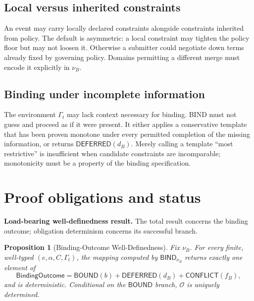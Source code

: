 \documentclass[11pt,openany]{book}
\newtheorem{proposition}[definition]{Proposition}
\newcommand{\Bind}{\mathsf{BIND}}
\begin{document}
\subsection{Local versus inherited constraints}

An event may carry locally declared constraints alongside constraints inherited
from policy. The default is asymmetric: a local constraint may tighten the
policy floor but may not loosen it. Otherwise a submitter could negotiate down
terms already fixed by governing policy. Domains permitting a different merge
must encode it explicitly in \(\nu_B\).

\subsection{Binding under incomplete information}

The environment \(\Gamma_t\) may lack context necessary for binding. BIND must
not guess and proceed as if it were present. It either applies a conservative
template that has been proven monotone under every permitted completion of the
missing information, or returns \(\mathsf{DEFERRED}(d_B)\). Merely calling a
template ``most restrictive'' is insufficient when candidate constraints are
incomparable; monotonicity must be a property of the binding specification.

\section{Proof obligations and status}

\textbf{Load-bearing well-definedness result.} The total result concerns the
binding outcome; obligation determinism concerns its successful branch.

\begin{proposition}[Binding-Outcome Well-Definedness]
Fix \(\nu_B\). For every finite, well-typed
\((e,\alpha,C,\Gamma_t)\), the mapping computed by \(\Bind_{\nu_B}\) returns
exactly one element of
\[
 \mathsf{BindingOutcome}
 =\mathsf{BOUND}(b)+\mathsf{DEFERRED}(d_B)+\mathsf{CONFLICT}(f_B),
\]
and is deterministic. Conditional on the \(\mathsf{BOUND}\) branch,
\(\mathcal O\) is uniquely determined.
\end{proposition}
\end{document}
